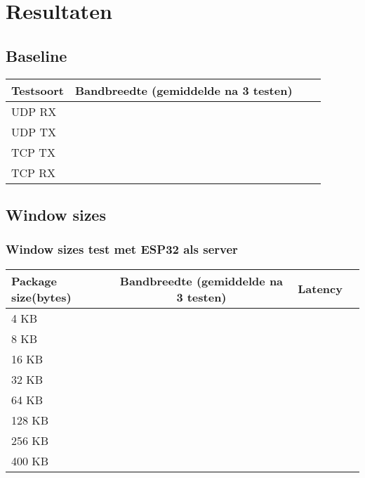 \documentclass[../DCM2_Verslag.tex]{subfiles}
\begin{document}
\section{Resultaten}
\subsection{Baseline}
	\begin{tabular}{||l|c|r|p{6cm}||}
   	 Testsoort & Bandbreedte (gemiddelde na 3 testen)\\
   	 \hline \hline    
   	 UDP RX &  \\
   	 UDP TX &  \\
   	 TCP TX & \\
   	 TCP RX &  \\
   	 \hline
	\end{tabular}

\subsection{Window sizes}

\subsubsection{Window sizes test met ESP32 als server}
	\begin{tabular}{||l|c|r|p{6cm}||}
   	 Package size(bytes) & Bandbreedte (gemiddelde na 3 testen) & Latency\\
   	 \hline \hline    
   	 4 KB &  & \\
   	 8 KB &  & \\
   	 16 KB & & \\
   	 32 KB &  & \\
   	 64 KB & & \\
   	 128 KB & & \\
   	 256 KB & & \\
   	 400 KB & &\\
   	 \hline
	\end{tabular}
	
\end{document}
